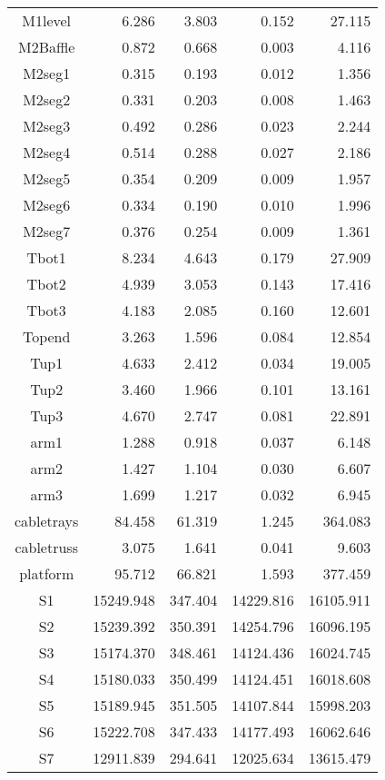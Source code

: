 \begin{longtable}{crrrr}
 M1level & 6.286 & 3.803 & 0.152 & 27.115 \\
 M2Baffle & 0.872 & 0.668 & 0.003 & 4.116 \\
 M2seg1 & 0.315 & 0.193 & 0.012 & 1.356 \\
 M2seg2 & 0.331 & 0.203 & 0.008 & 1.463 \\
 M2seg3 & 0.492 & 0.286 & 0.023 & 2.244 \\
 M2seg4 & 0.514 & 0.288 & 0.027 & 2.186 \\
 M2seg5 & 0.354 & 0.209 & 0.009 & 1.957 \\
 M2seg6 & 0.334 & 0.190 & 0.010 & 1.996 \\
 M2seg7 & 0.376 & 0.254 & 0.009 & 1.361 \\
 Tbot1 & 8.234 & 4.643 & 0.179 & 27.909 \\
 Tbot2 & 4.939 & 3.053 & 0.143 & 17.416 \\
 Tbot3 & 4.183 & 2.085 & 0.160 & 12.601 \\
 Topend & 3.263 & 1.596 & 0.084 & 12.854 \\
 Tup1 & 4.633 & 2.412 & 0.034 & 19.005 \\
 Tup2 & 3.460 & 1.966 & 0.101 & 13.161 \\
 Tup3 & 4.670 & 2.747 & 0.081 & 22.891 \\
 arm1 & 1.288 & 0.918 & 0.037 & 6.148 \\
 arm2 & 1.427 & 1.104 & 0.030 & 6.607 \\
 arm3 & 1.699 & 1.217 & 0.032 & 6.945 \\
 cabletrays & 84.458 & 61.319 & 1.245 & 364.083 \\
 cabletruss & 3.075 & 1.641 & 0.041 & 9.603 \\
 platform & 95.712 & 66.821 & 1.593 & 377.459 \\
 S1 & 15249.948 & 347.404 & 14229.816 & 16105.911 \\
 S2 & 15239.392 & 350.391 & 14254.796 & 16096.195 \\
 S3 & 15174.370 & 348.461 & 14124.436 & 16024.745 \\
 S4 & 15180.033 & 350.499 & 14124.451 & 16018.608 \\
 S5 & 15189.945 & 351.505 & 14107.844 & 15998.203 \\
 S6 & 15222.708 & 347.433 & 14177.493 & 16062.646 \\
 S7 & 12911.839 & 294.641 & 12025.634 & 13615.479 \\
\bottomrule
\end{longtable}

